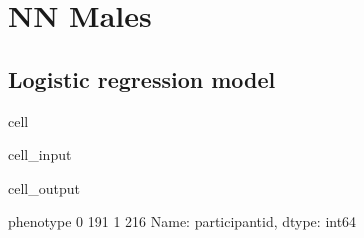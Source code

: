 \documentclass[letterpaper,10pt,english]{jupyterBook}
\begin{document}
\section{NN Males}
\label{\detokenize{Cooper:nn-males}}

\subsection{Logistic regression model}
\label{\detokenize{Cooper:id16}}
\begin{sphinxuseclass}{cell}\begin{sphinxVerbatimInput}

\begin{sphinxuseclass}{cell_input}
\begin{sphinxVerbatim}[commandchars=\\\{\}]
  \PYG{p}{[}    \PYG{p}{]}
  \PYG{p}{[}\PYG{p}{[}\PYG{p}{]}\PYG{p}{]}
  \PYG{p}{[}\PYG{p}{]}
     
\PYG{p}{[}\PYG{p}{]}
\end{sphinxVerbatim}

\end{sphinxuseclass}\end{sphinxVerbatimInput}
\begin{sphinxVerbatimOutput}

\begin{sphinxuseclass}{cell_output}
\begin{sphinxVerbatim}[commandchars=\\\{\}]
phenotype
0    191
1    216
Name: participant\PYGZus{}id, dtype: int64
\end{sphinxVerbatim}

\end{sphinxuseclass}\end{sphinxVerbatimOutput}

\end{sphinxuseclass}
\end{document}
